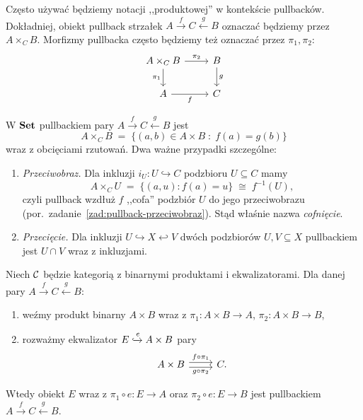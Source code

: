 \begin{uwaga}
Często używać będziemy notacji ,,produktowej'' w kontekście pullbacków. Dokładniej, obiekt pullback strzałek $A\xrightarrow{f} C \xleftarrow{g} B$ oznaczać będziemy przez $A\times_C B$. Morfizmy pullbacka często będziemy też oznaczać przez $\pi_1,\pi_2$:
\[\begin{tikzcd}
A\times_C B \arrow[r,"\pi_2"] \arrow[d,swap,"\pi_1"] & B \arrow[d,"g"] \\
A \arrow[r,swap,"f"] & C
\end{tikzcd}\]
\end{uwaga}

\begin{przyklad}
W $\mathbf{Set}$ pullbackiem pary $A\xrightarrow{f} C \xleftarrow{g} B$ jest
\[
A\times_C B \;=\; \{(a,b)\in A\times B \;:\; f(a) = g(b)\}
\]
wraz z obcięciami rzutowań. Dwa ważne przypadki szczególne:
\begin{enumerate}
\item \emph{Przeciwobraz.} Dla inkluzji $i_U \colon U \hookrightarrow C$ podzbioru $U\subseteq C$ mamy
\[
A \times_C U \;=\; \{(a,u) : f(a) = u\} \;\cong\; f^{-1}(U),
\]
czyli pullback wzdłuż $f$ ,,cofa'' podzbiór $U$ do jego przeciwobrazu (por.\ zadanie~\ref{zad:pullback-przeciwobraz}). Stąd właśnie nazwa \emph{cofnięcie}.
\item \emph{Przecięcie.} Dla inkluzji $U \hookrightarrow X \hookleftarrow V$ dwóch podzbiorów $U, V \subseteq X$ pullbackiem jest $U \cap V$ wraz z inkluzjami.
\end{enumerate}
\end{przyklad}

\begin{stwierdzenie}
Niech $\mathcal{C}$ będzie kategorią z binarnymi produktami i ekwalizatorami. Dla danej pary $A\xrightarrow{f} C \xleftarrow{g} B$:
\begin{enumerate}
\item weźmy produkt binarny $A\times B$ wraz z $\pi_1\colon A\times B\to A$, $\pi_2\colon A\times B\to B$,
\item rozważmy ekwalizator $E \xhookrightarrow{e} A\times B$ pary
\[\begin{tikzcd}
A\times B \arrow[r,shift left,"f\circ \pi_1"] \arrow[r,shift right,swap,"g\circ \pi_2"] & C.
\end{tikzcd}\]
\end{enumerate}
Wtedy obiekt $E$ wraz z $\pi_1\circ e\colon E\to A$ oraz $\pi_2\circ e\colon E\to B$ jest pullbackiem $A\xrightarrow{f} C \xleftarrow{g} B$.
\end{stwierdzenie}

